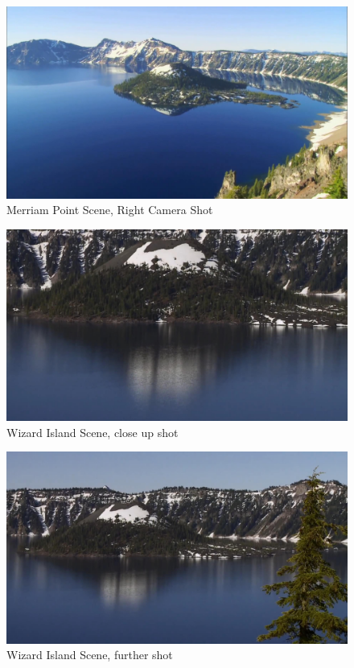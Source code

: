 \documentclass[11pt,psfig]{article}
\begin{document}
\begin{figure}[H]
\centering
\includegraphics[width=\columnwidth]{sfmPics1J2/shot26.jpg}
\caption{Merriam Point Scene, Right Camera Shot}
\end{figure}
\begin{figure}[H]
\centering
\includegraphics[width=\columnwidth]{sfmPics3/shot1.jpg}
\caption{Wizard Island Scene, close up shot}
\end{figure}
\begin{figure}[H]
\centering
\includegraphics[width=\columnwidth]{sfmPics3/shot24.jpg}
\caption{Wizard Island Scene, further shot}
\end{figure}
\end{document}
